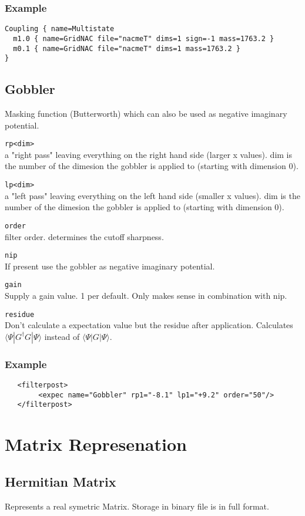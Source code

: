 \documentclass[a4paper,12pt]{scrbook}
\newcommand{\option}[2]{\item \texttt{#1}\\ #2}
\begin{document}
\subsubsection*{Example}
\begin{verbatim}
Coupling { name=Multistate
  m1.0 { name=GridNAC file="nacmeT" dims=1 sign=-1 mass=1763.2 }
  m0.1 { name=GridNAC file="nacmeT" dims=1 mass=1763.2 }
}
\end{verbatim}


\subsection{Gobbler}
Masking function (Butterworth) which can also be used as negative imaginary potential.

\begin{options}
\option{rp<dim>}{a "right pass" leaving everything on the right hand side (larger x values). dim is the number of the dimesion the gobbler is applied to (starting with dimension 0).}
\option{lp<dim>}{a "left pass" leaving everything on the left hand side (smaller x values). dim is the number of the dimesion the gobbler is applied to (starting with dimension 0).}
\option{order}{filter order. determines the cutoff sharpness.}
\option{nip}{If present use the gobbler as negative imaginary potential.}
\option{gain}{Supply a gain value. 1 per default. Only makes sense in combination with nip.}
\option{residue}{Don't calculate a expectation value but the residue after application. Calculates $\langle \Psi|G^\dagger G|\Psi\rangle$ instead of $\langle \Psi|G|\Psi\rangle$.}
\end{options}

\subsubsection*{Example}
\begin{verbatim}
   <filterpost>
        <expec name="Gobbler" rp1="-8.1" lp1="+9.2" order="50"/>
   </filterpost>
\end{verbatim}


\section{Matrix Represenation}
\subsection{Hermitian Matrix}
Represents a real symetric Matrix.
Storage in binary file is in full format.
\end{document}
